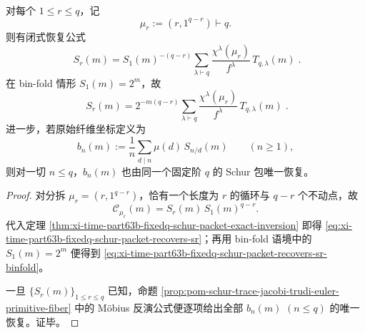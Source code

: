 \begin{corollary}\label{cor:xi-time-part63b-fixedq-schur-packet-recovers-low-moments-primitives}
对每个 \(1\le r\le q\)，记
\[
\mu_r:=(r,1^{q-r})\vdash q.
\]
则有闭式恢复公式
\begin{equation}\label{eq:xi-time-part63b-fixedq-schur-packet-recovers-sr}
\boxed{\;
S_r(m)
=
S_1(m)^{-(q-r)}
\sum_{\lambda\vdash q}\frac{\chi^\lambda(\mu_r)}{f^\lambda}\,T_{q,\lambda}(m)\; }.
\end{equation}
在 bin-fold 情形 \(S_1(m)=2^m\)，故
\begin{equation}\label{eq:xi-time-part63b-fixedq-schur-packet-recovers-sr-binfold}
\boxed{\;
S_r(m)
=
2^{-m(q-r)}
\sum_{\lambda\vdash q}\frac{\chi^\lambda(\mu_r)}{f^\lambda}\,T_{q,\lambda}(m)\; }.
\end{equation}
进一步，若原始纤维坐标定义为
\[
b_n(m):=\frac{1}{n}\sum_{d\mid n}\mu(d)\,S_{n/d}(m)
\qquad (n\ge 1),
\]
则对一切 \(n\le q\)，\(b_n(m)\) 也由同一个固定阶 \(q\) 的 Schur 包唯一恢复。
\end{corollary}
\begin{proof}
对分拆 \(\mu_r=(r,1^{q-r})\)，恰有一个长度为 \(r\) 的循环与 \(q-r\) 个不动点，故
\[
\mathcal C_{\mu_r}(m)=S_r(m)\,S_1(m)^{q-r}.
\]
代入定理 \ref{thm:xi-time-part63b-fixedq-schur-packet-exact-inversion} 即得
\eqref{eq:xi-time-part63b-fixedq-schur-packet-recovers-sr}；再用 bin-fold 语境中的
\(
S_1(m)=2^m
\)
便得到 \eqref{eq:xi-time-part63b-fixedq-schur-packet-recovers-sr-binfold}。

一旦 \(\{S_r(m)\}_{1\le r\le q}\) 已知，命题
\ref{prop:pom-schur-trace-jacobi-trudi-euler-primitive-fiber} 中的 Möbius 反演公式便逐项给出全部
\(
b_n(m)
\)
\((n\le q)\) 的唯一恢复。证毕。
\end{proof}

